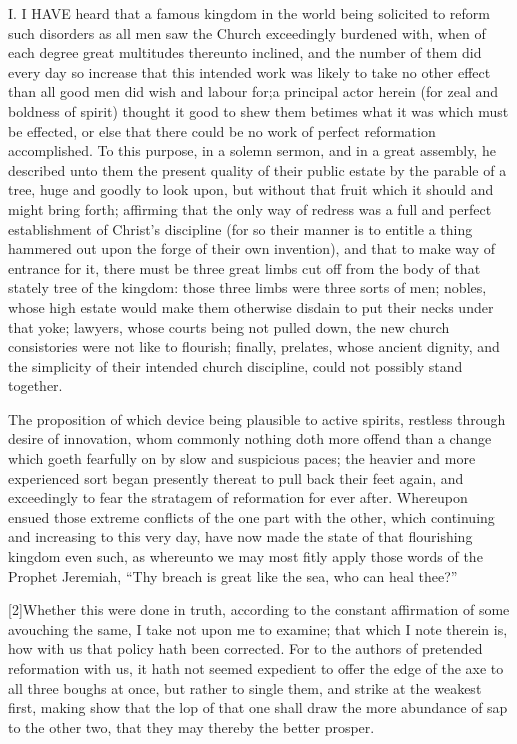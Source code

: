 I. I HAVE heard that a famous kingdom in the world being solicited to reform such disorders as all men saw the Church exceedingly burdened with, when of each degree great multitudes thereunto inclined, and the number of them did every day so increase that this intended work was likely to take no other effect than all good men did wish and labour for;a principal actor herein (for zeal and boldness of spirit) thought it good to shew them betimes what it was which must be effected, or else that there could be no work of perfect reformation accomplished. To this purpose, in a solemn sermon, and in a great assembly, he described unto them the present quality of their public estate by the parable of a tree, huge and goodly to look upon, but without that fruit which it should and might bring forth; affirming that the only way of redress was a full and perfect establishment of Christ’s discipline (for so their manner is to entitle a thing hammered out upon the forge of their own invention), and that to make way of entrance for it, there must be three great limbs cut off from the body of that stately tree of the kingdom: those three limbs were three sorts of men; nobles, whose high estate would make them otherwise disdain to put their necks under  that yoke; lawyers, whose courts being not pulled down, the new church consistories were not like to flourish; finally, prelates, whose ancient dignity, and the simplicity of their intended church discipline, could not possibly stand together.

 The proposition of which device being plausible to active spirits, restless through desire of innovation, whom commonly nothing doth more offend than a change which goeth fearfully on by slow and suspicious paces; the heavier and more experienced sort began presently thereat to pull back their feet again, and exceedingly to fear the stratagem of reformation for ever after. Whereupon ensued those extreme conflicts of the one part with the other, which continuing and increasing to this very day, have now made the state of that flourishing kingdom even such, as whereunto we may most fitly apply those words of the Prophet Jeremiah, “Thy breach is great like the sea, who can heal thee?”

[2]Whether this were done in truth, according to the constant affirmation of some avouching the same, I take not upon me to examine; that which I note therein is, how with us that policy hath been corrected. For to the authors of pretended reformation with us, it hath not seemed expedient to offer the edge of the axe to all three boughs at once, but rather to single them, and strike at the weakest first, making show that the lop of that one shall draw the more abundance of sap to the other two, that they may thereby the better prosper.

